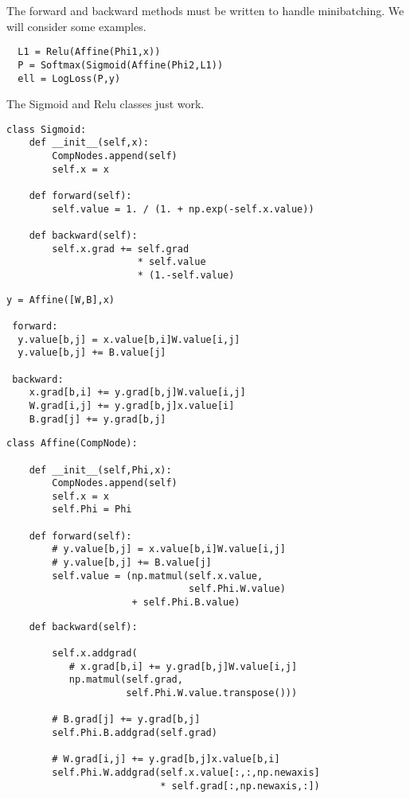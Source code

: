 {

The forward and backward methods must be written to handle minibatching.  We will consider some examples.



\vfill
\begin{verbatim}
  L1 = Relu(Affine(Phi1,x))
  P = Softmax(Sigmoid(Affine(Phi2,L1))
  ell = LogLoss(P,y)
\end{verbatim}



The Sigmoid and Relu classes just work.

\begin{verbatim}
class Sigmoid:
    def __init__(self,x):
        CompNodes.append(self)
        self.x = x

    def forward(self):
        self.value = 1. / (1. + np.exp(-self.x.value))

    def backward(self):
        self.x.grad += self.grad
                       * self.value
                       * (1.-self.value)
\end{verbatim}


\vfill
\eject
\begin{verbatim}
y = Affine([W,B],x)

 forward:
  y.value[b,j] = x.value[b,i]W.value[i,j]
  y.value[b,j] += B.value[j]

 backward:
    x.grad[b,i] += y.grad[b,j]W.value[i,j]
    W.grad[i,j] += y.grad[b,j]x.value[i]
    B.grad[j] += y.grad[b,j]
\end{verbatim}

\vfill
\eject
\begin{verbatim}
class Affine(CompNode):

    def __init__(self,Phi,x):
        CompNodes.append(self)
        self.x = x
        self.Phi = Phi

    def forward(self):
        # y.value[b,j] = x.value[b,i]W.value[i,j]
        # y.value[b,j] += B.value[j]
        self.value = (np.matmul(self.x.value,
                                self.Phi.W.value)
                      + self.Phi.B.value)
\end{verbatim}
\vfill
\eject
\vfill
\begin{verbatim}
    def backward(self):

        self.x.addgrad(
           # x.grad[b,i] += y.grad[b,j]W.value[i,j]
           np.matmul(self.grad,
                     self.Phi.W.value.transpose()))

        # B.grad[j] += y.grad[b,j]
        self.Phi.B.addgrad(self.grad)

        # W.grad[i,j] += y.grad[b,j]x.value[b,i]
        self.Phi.W.addgrad(self.x.value[:,:,np.newaxis]
                           * self.grad[:,np.newaxis,:])
\end{verbatim}

}

